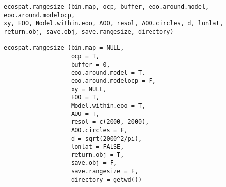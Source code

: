 \documentclass[a4paper]{book}
\begin{document}
%
\begin{Usage}
\begin{verbatim}
ecospat.rangesize (bin.map, ocp, buffer, eoo.around.model, eoo.around.modelocp, 
xy, EOO, Model.within.eoo, AOO, resol, AOO.circles, d, lonlat, return.obj, save.obj, save.rangesize, directory)

ecospat.rangesize (bin.map = NULL,
                   ocp = T,
                   buffer = 0,
                   eoo.around.model = T,
                   eoo.around.modelocp = F,
                   xy = NULL,
                   EOO = T,
                   Model.within.eoo = T,
                   AOO = T,
                   resol = c(2000, 2000),
                   AOO.circles = F,
                   d = sqrt(2000^2/pi),
                   lonlat = FALSE,
                   return.obj = T,
                   save.obj = F,
                   save.rangesize = F,
                   directory = getwd())



\end{verbatim}
\end{Usage}
%
\end{document}

